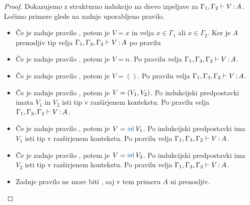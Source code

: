 \begin{proof}
	Dokazujemo z strukturno indukcijo na drevo izpeljave za $\Gamma_1, \Gamma_2 \vdash V \mathinner{:} A$.
	Ločimo primere glede na zadnje uporabljeno pravilo.
	
	\begin{itemize}
		\item[\sitem] Če je zadnje pravilo , potem je $V = x$ in velja $x \in \Gamma_1$ ali $x \in \Gamma_2$.
		Ker je $A$ prenosljiv tip velja $\Gamma_1, \Gamma_3, \Gamma_2 \vdash V \mathinner{:} A$ po pravilu 
		
		\item Če je zadnje pravilo , potem je $V = n$. Po pravilu  velja $\Gamma_1, \Gamma_3, \Gamma_2 \vdash V \mathinner{:} A$.
		
		\item Če je zadnje pravilo , potem je $V = ()$. Po pravilu  velja $\Gamma_1, \Gamma_3, \Gamma_2 \vdash V \mathinner{:} A$.
		
		\item Če je zadnje pravilo , potem je $V =( V_1 , V_2 )$. Po indukcijski predpostavki imata $V_1$ in $V_2$ isti tip v razširjenem kontekstu.
		Po pravilu  velja $\Gamma_1, \Gamma_3, \Gamma_2 \vdash V \mathinner{:} A$.
		
		\item Če je zadnje pravilo , potem je $V = \tminl{V_1}$. Po indukcijski predpostavki ima $V_1$ isti tip v razširjenem kontekstu.
		Po pravilu  velja $\Gamma_1, \Gamma_3, \Gamma_2 \vdash V \mathinner{:} A$.
		
		\item Če je zadnje pravilo , potem je $V = \tminl{V_2}$. Po indukcijski predpostavki ima $V_2$ isti tip v razširjenem kontekstu.
		Po pravilu  velja $\Gamma_1, \Gamma_3, \Gamma_2 \vdash V \mathinner{:} A$.
		
		\item Zadnje pravilo ne more biti , saj v tem primeru $A$ ni prenosljiv.
		

\end{itemize}
\end{proof}

